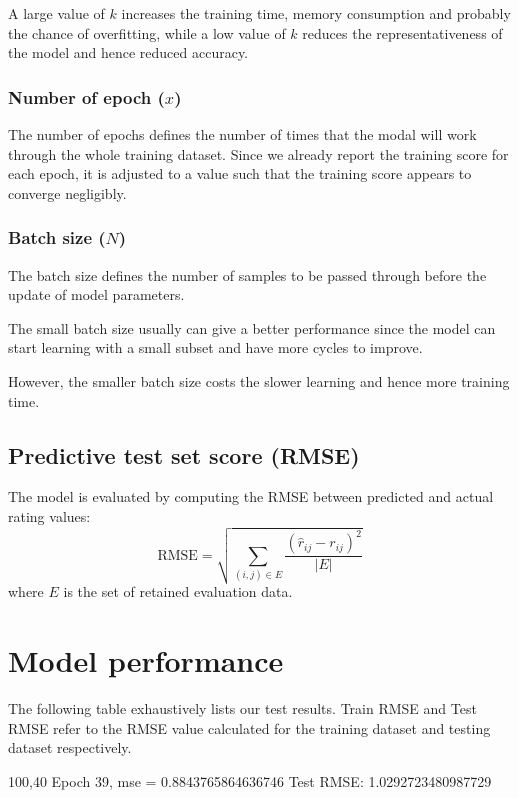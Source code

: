 \documentclass[final]{cvpr}
\begin{document}
A large value of $k$ increases the training time, memory consumption and probably the chance of overfitting,
while a low value of $k$ reduces the representativeness of the model and hence reduced accuracy.

\subsubsection{Number of epoch ($x$)}
The number of epochs defines the number of times that the modal will work through the whole training dataset.
Since we already report the training score for each epoch, it is adjusted to a value such that the training score appears to converge negligibly.


\subsubsection{Batch size ($N$)}
The batch size defines the number of samples to be passed through before the update of model parameters.

The small batch size usually can give a better performance since the model can start learning with a small subset and have more cycles to improve.

However, the smaller batch size costs the slower learning and hence more training time.

\subsection{Predictive test set score (RMSE)}
The model is evaluated by computing the RMSE between predicted and actual rating values:
$$ \text{RMSE} = \sqrt{\sum_{(i, j) \in E} \frac{{(\hat r_{ij} - r_{ij})}^2}{\left| E \right|}} $$
where $E$ is the set of retained evaluation data.

\section{Model performance}
The following table exhaustively lists our test results. Train RMSE and Test RMSE refer to the RMSE value calculated for the training dataset and testing dataset respectively.

100,40
Epoch 39, mse = 0.8843765864636746
Test RMSE: 1.0292723480987729
\end{document}
